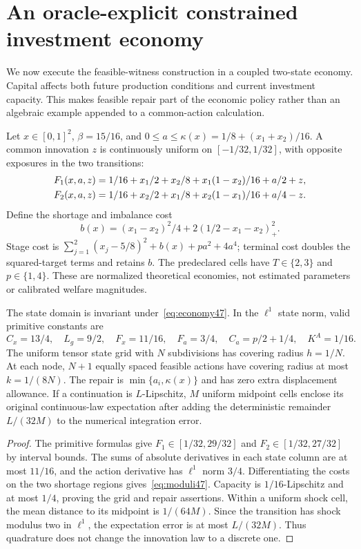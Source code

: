 \section{An oracle-explicit constrained investment economy}\label{sec:constrained47}
We now execute the feasible-witness construction in a coupled two-state economy. Capital affects both future production conditions and current investment capacity. This makes feasible repair part of the economic policy rather than an algebraic example appended to a common-action calculation.

Let $x\in[0,1]^2$, $\beta=15/16$, and $0\le a\le\kappa(x)=1/8+(x_1+x_2)/16$. A common innovation $z$ is continuously uniform on $[-1/32,1/32]$, with opposite exposures in the two transitions:
\begin{align}\label{eq:economy47}
 F_1(x,a,z)&=1/16+x_1/2+x_2/8+x_1(1-x_2)/16+a/2+z,\\
 F_2(x,a,z)&=1/16+x_2/2+x_1/8+x_2(1-x_1)/16+a/4-z.\notag
\end{align}
Define the shortage and imbalance cost
\[
 b(x)=(x_1-x_2)^2/4+2(1/2-x_1-x_2)_+^2.
\]
Stage cost is $\sum_{j=1}^2(x_j-5/8)^2+b(x)+pa^2+4a^4$; terminal cost doubles the squared-target terms and retains $b$. The predeclared cells have $T\in\{2,3\}$ and $p\in\{1,4\}$. These are normalized theoretical economies, not estimated parameters or calibrated welfare magnitudes.

\begin{proposition}\label{prop:primitive47}
The state domain is invariant under~\eqref{eq:economy47}. In the $\ell^1$ state norm, valid primitive constants are
\begin{equation}\label{eq:moduli47}
 C_x=13/4,\quad L_g=9/2,\quad F_x=11/16,\quad
 F_a=3/4,\quad C_a=p/2+1/4,\quad K^A=1/16.
\end{equation}
The uniform tensor state grid with $N$ subdivisions has covering radius $h=1/N$. At each node, $N+1$ equally spaced feasible actions have covering radius at most $k=1/(8N)$. The repair is $\min\{a_i,\kappa(x)\}$ and has zero extra displacement allowance. If a continuation is $L$-Lipschitz, $M$ uniform midpoint cells enclose its original continuous-law expectation after adding the deterministic remainder $L/(32M)$ to the numerical integration error.
\end{proposition}
\begin{proof}
The primitive formulas give $F_1\in[1/32,29/32]$ and $F_2\in[1/32,27/32]$ by interval bounds. The sums of absolute derivatives in each state column are at most $11/16$, and the action derivative has $\ell^1$ norm $3/4$. Differentiating the costs on the two shortage regions gives~\eqref{eq:moduli47}. Capacity is $1/16$-Lipschitz and at most $1/4$, proving the grid and repair assertions. Within a uniform shock cell, the mean distance to its midpoint is $1/(64M)$. Since the transition has shock modulus two in $\ell^1$, the expectation error is at most $L/(32M)$. Thus quadrature does not change the innovation law to a discrete one.
\end{proof}

